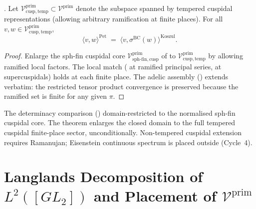 \begin{theorem}
\label{v4-arith:kms-gns:thm:ramified-cuspidal-tempered-extension}
\ClaimStatusProvedHere. Let \(\mathcal{V}^{\mathrm{prim}}_{\mathrm{cusp,temp}}\subset\mathcal{V}^{\mathrm{prim}}\)
denote the subspace spanned by tempered cuspidal representations
(allowing arbitrary ramification at finite places). For all
\(v,w\in\mathcal{V}^{\mathrm{prim}}_{\mathrm{cusp,temp}}\),
\begin{equation}
\label{v4-arith:kms-gns:eq:ramified-cuspidal-match}
\langle v,w\rangle^{\mathrm{Pet}}\;=\;\langle v,\sigma^{\mathrm{BC}}(w)\rangle^{\mathrm{Koszul}}.
\end{equation}
\end{theorem}

\begin{proof}
Enlarge the sph-fin cuspidal core
\(\mathcal{V}^{\mathrm{prim}}_{\mathrm{sph\text{-}fin,cusp}}\) of
 to
\(\mathcal{V}^{\mathrm{prim}}_{\mathrm{cusp,temp}}\) by allowing
ramified local factors. The local match
( at ramified
principal series,  at
supercuspidals) holds at each finite place. The adelic assembly
() extends verbatim: the
restricted tensor product convergence is preserved because the
ramified set is finite for any given \(\pi\).
\end{proof}

\begin{remark}
\label{v4-arith:kms-gns:rem:w3-tightening}
The determinacy comparison () domain-restricted
 to the normalised sph-fin
cuspidal core. The theorem
enlarges the closed domain to the full tempered cuspidal finite-place
sector, unconditionally. Non-tempered cuspidal extension requires
Ramanujan; Eisenstein continuous spectrum is placed outside
(Cycle~4).
\end{remark}

\section{Langlands Decomposition of \(L^{2}([GL_{2}])\) and Placement of \(\mathcal{V}^{\mathrm{prim}}\)}
\label{v4-arith:kms-gns:cycle3}

